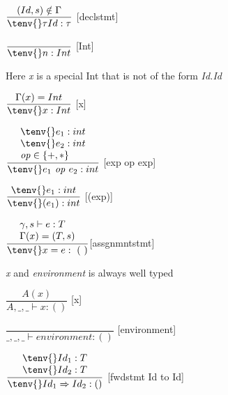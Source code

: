 
\hspace*{10em}
$ \dfrac{(Id, s)\notin \Gamma}{\tenv{} \tau Id : \tau}$ [declstmt]\bigskip

\hspace*{10em}
$ \dfrac{\phantom{}} {\tenv{} n: Int}$ [Int]\bigskip

Here \textit{x} is a special Int that is not of the form
\textit{Id.Id}\bigskip

\hspace*{10em}
$ \dfrac{\Gamma(x)=Int}{\tenv{} x: Int}$ [x]\bigskip

\hspace*{10em}
$\dfrac{
\begin{array}{l}
    \tenv{} e_1 : int\\
    \tenv{} e_2 : int\\
    \text{\textit{op}} \in \{+,*\}
\end{array}}
{\tenv{} e_1 \text{\textit{ op }} e_2: int}$
[exp op exp]\bigskip


\hspace*{10em}
$ \dfrac{\tenv{}e_1:int}{\tenv{} (e_1): int}$ [(exp)]\bigskip


\hspace*{10em}
$ \dfrac{
\begin{array}{l}
    \gamma, s \vdash e : T\\
    \Gamma (x) = (T,s)
\end{array}}
{\tenv{} x=e:~(~)} $[assgnmntstmt]\bigskip

\textit{x} and \textit{environment} is always well typed\bigskip

\hspace*{10em}
$ \dfrac{A(x)}{A,\_,\_ \vdash x:()}$ [x]\bigskip

\hspace*{10em}
$ \dfrac{\phantom{}}{\_,\_,\_ \vdash environment: ()}$ [environment]\bigskip

\hspace*{10em}
$ \dfrac{
\begin{array}{l}
    \tenv{} Id_1 : T\\
    \tenv{} Id_2 : T\\
\end{array}
}{\tenv{} Id_1 \Rightarrow Id_2 : ()}$ [fwdstmt Id to Id]\bigskip

